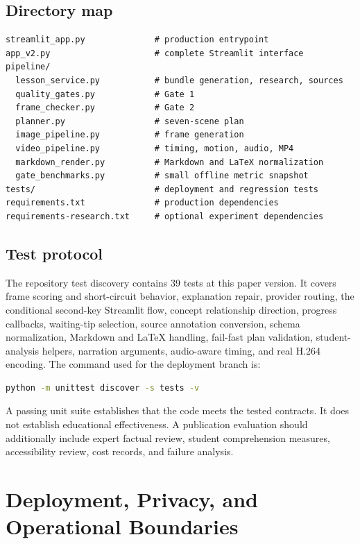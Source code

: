 \documentclass[11pt]{article}
\theoremstyle{plain}
\theoremstyle{definition}
\begin{document}
\subsection{Directory map}

\begin{lstlisting}
streamlit_app.py              # production entrypoint
app_v2.py                     # complete Streamlit interface
pipeline/
  lesson_service.py           # bundle generation, research, sources
  quality_gates.py            # Gate 1
  frame_checker.py            # Gate 2
  planner.py                  # seven-scene plan
  image_pipeline.py           # frame generation
  video_pipeline.py           # timing, motion, audio, MP4
  markdown_render.py          # Markdown and LaTeX normalization
  gate_benchmarks.py          # small offline metric snapshot
tests/                        # deployment and regression tests
requirements.txt              # production dependencies
requirements-research.txt     # optional experiment dependencies
\end{lstlisting}

\subsection{Test protocol}

The repository test discovery contains 39 tests at this paper version. It covers frame scoring and short-circuit behavior, explanation repair, provider routing, the conditional second-key Streamlit flow, concept relationship direction, progress callbacks, waiting-tip selection, source annotation conversion, schema normalization, Markdown and LaTeX handling, fail-fast plan validation, student-analysis helpers, narration arguments, audio-aware timing, and real H.264 encoding. The command used for the deployment branch is:

\begin{lstlisting}[language=bash]
python -m unittest discover -s tests -v
\end{lstlisting}

A passing unit suite establishes that the code meets the tested contracts. It does not establish educational effectiveness. A publication evaluation should additionally include expert factual review, student comprehension measures, accessibility review, cost records, and failure analysis.
\section{Deployment, Privacy, and Operational Boundaries}
\end{document}
